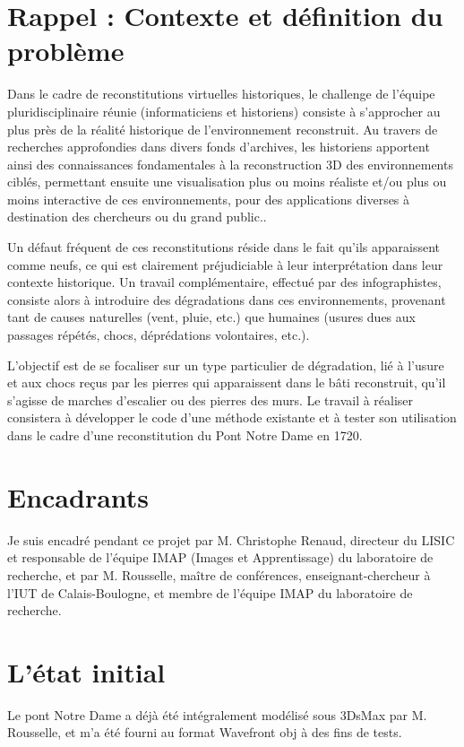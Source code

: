 \documentclass[a4paper,french]{report}
\begin{document}
		\section{Rappel : Contexte et définition du problème}
			Dans le cadre de reconstitutions virtuelles historiques,  le challenge de l'équipe pluridisciplinaire réunie (informaticiens et historiens) consiste à s'approcher au plus près de la réalité historique de l'environnement reconstruit. Au travers de recherches approfondies dans divers fonds d'archives, les historiens apportent ainsi des connaissances fondamentales à la reconstruction 3D des environnements ciblés, permettant ensuite une visualisation plus ou moins réaliste et/ou plus ou moins interactive de ces environnements, pour des applications diverses à destination des chercheurs ou du grand public.. \par
			Un défaut fréquent de ces reconstitutions réside dans le fait qu'ils apparaissent comme neufs, ce qui est clairement préjudiciable à leur interprétation dans leur contexte historique. Un travail complémentaire, effectué par des infographistes, consiste alors à introduire des dégradations dans ces environnements, provenant tant de causes naturelles (vent, pluie, etc.) que humaines (usures dues aux passages répétés, chocs, déprédations volontaires, etc.). \par
			L'objectif est de se focaliser sur un type particulier de dégradation, lié à l'usure et aux chocs reçus par les pierres qui apparaissent dans le bâti reconstruit, qu'il s'agisse de marches d'escalier ou des pierres des murs. Le travail à réaliser consistera à développer le code d'une méthode existante et à tester son utilisation dans le cadre d'une reconstitution du Pont Notre Dame en 1720.
		\section{Encadrants}
			Je suis encadré pendant ce projet par M. Christophe Renaud, directeur du LISIC et responsable de l'équipe IMAP (Images et Apprentissage) du laboratoire de recherche, et par M. Rousselle, maître de conférences, enseignant-chercheur à l'IUT de Calais-Boulogne, et membre de l'équipe IMAP du laboratoire de recherche.
		\section{L'état initial}
			Le pont Notre Dame a déjà été intégralement modélisé sous 3DsMax par M. Rousselle, et m'a été fourni au format Wavefront obj à des fins de tests. 
\end{document}
